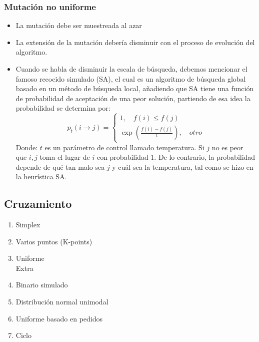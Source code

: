 \documentclass[10pt]{article}
\begin{document}
\subsubsection{Mutación no uniforme}
\begin{itemize}
  \item La mutación debe ser muestreada al azar
  \item La extensión de la mutación debería disminuir con el proceso de evolución del algoritmo.
  \item Cuando se habla de disminuir la escala de búsqueda, debemos mencionar el famoso recocido simulado (SA), el cual es un algoritmo de búsqueda global basado en un método de búsqueda local, añadiendo que SA tiene una función de probabilidad de aceptación de una peor solución, partiendo de esa idea la probabilidad se determina por:
  \[p_{t}(i\rightarrow j)=\left\{
  \begin{aligned}
    1,\quad f(i)\leq f(j)\\
    \exp\left(\frac{f(i)-f(j)}{t}\right),\quad otro
  \end{aligned}
  \right.\]
  Donde: \(\displaystyle t\)  es un parámetro de control llamado temperatura. Si $j$ no es peor que $i, j$ toma el lugar de $i$ con probabilidad $1$. De lo contrario, la probabilidad depende de qué tan malo sea $j$ y cuál sea la temperatura, tal como se hizo en la heurística SA.
\end{itemize}
\subsection{Cruzamiento}
\begin{enumerate}
  \item Simplex
  \item Varios puntos (K-points)
  \item Uniforme
  \\Extra
  \item Binario simulado
  \item Distribución normal unimodal
  \item Uniforme basado en pedidos
  \item Ciclo
\end{enumerate}
\end{document}
